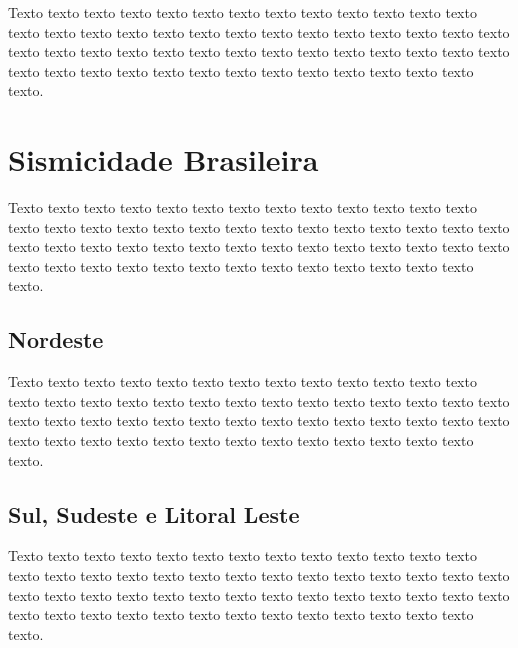 Texto texto texto texto texto texto texto texto texto texto texto texto texto
texto texto texto texto texto texto texto texto texto texto texto texto texto
texto texto texto texto texto texto texto texto texto texto texto texto texto
texto texto texto texto texto texto texto texto texto texto texto texto texto
texto texto texto.


\section{Sismicidade Brasileira}
\label{sec:fundamentos}

Texto texto texto texto texto texto texto texto texto texto texto texto texto
texto texto texto texto texto texto texto texto texto texto texto texto texto
texto texto texto texto texto texto texto texto texto texto texto texto texto
texto texto texto texto texto texto texto texto texto texto texto texto texto
texto texto texto.

\subsection{Nordeste}
\label{sec:fundamentos}

Texto texto texto texto texto texto texto texto texto texto texto texto texto
texto texto texto texto texto texto texto texto texto texto texto texto texto
texto texto texto texto texto texto texto texto texto texto texto texto texto
texto texto texto texto texto texto texto texto texto texto texto texto texto
texto texto texto.

\subsection{Sul, Sudeste e Litoral Leste}
\label{sec:fundamentos}

Texto texto texto texto texto texto texto texto texto texto texto texto texto
texto texto texto texto texto texto texto texto texto texto texto texto texto
texto texto texto texto texto texto texto texto texto texto texto texto texto
texto texto texto texto texto texto texto texto texto texto texto texto texto
texto texto texto.


